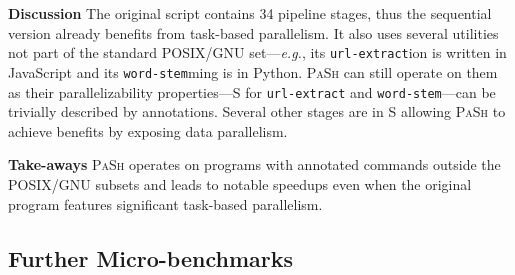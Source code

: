 \documentclass[sigplan, review, screen, anonymous]{acmart}
\newcommand{\eg}{{\em e.g.}, }
\newcommand{\heading}[1]{\vspace{4pt}\noindent\textbf{#1}\enspace}
\newcommand{\ttt}[1]{\texttt{#1}}
\newcommand{\cn}[1]{\mbox{\textcircled{\footnotesize #1}}}
\newcommand{\sta}{\cn{\textsc{S}}\xspace}
\newcommand{\pur}{\cn{\textsc{P}}\xspace}
\newcommand{\dfs}{\cn{\textsc{F}}\xspace}
\newcommand{\kk}[1]{[{\color{magenta}kk: #1}]}
\newcommand{\sys}{{\scshape PaSh}\xspace}
\begin{document}

\heading{Discussion}
The original script contains 34 pipeline stages, thus the sequential version already benefits from task-based parallelism.
It also uses several utilities not part of the standard POSIX/GNU set---\eg its \ttt{url-extract}ion is written in JavaScript and its \ttt{word-stem}ming is in Python.
\sys can still operate on them as their parallelizability properties---\sta for \ttt{url-extract} and \ttt{word-stem}---can be trivially described by annotations.
Several other stages are in \sta allowing \sys to achieve benefits by exposing data parallelism.

\heading{Take-aways}
\sys operates on programs with annotated commands outside the POSIX/GNU subsets and leads to notable speedups even when the original program features significant task-based parallelism.

% 
% 
% 
% 

\subsection{Further Micro-benchmarks}
\label{micro}

\end{document}
